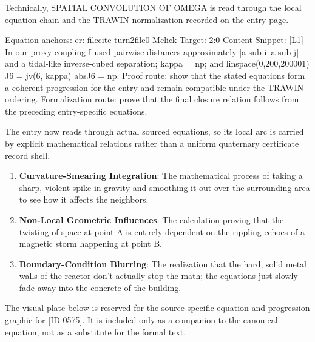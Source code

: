 Technically, SPATIAL CONVOLUTION OF OMEGA is read through the local equation chain and the TRAWIN normalization recorded on the entry page.

Equation anchors: er:  filecite turn2file0  Mclick Target: 2:0 Content Snippet: [L1]   In our proxy coupling I used pairwise distances approximately |a sub i--a sub j| and a tidal-like inverse-cubed separation; kappa = np; and linspace(0,200,200001) J6 = jv(6, kappa) absJ6 = np. Proof route: show that the stated equations form a coherent progression for the entry and remain compatible under the TRAWIN ordering. Formalization route: prove that the final closure relation follows from the preceding entry-specific equations.

The entry now reads through actual sourced equations, so its local arc is carried by explicit mathematical relations rather than a uniform quaternary certificate record shell.
\endgroup

\begin{enumerate}[leftmargin=1.6em,itemsep=6pt,topsep=4pt]
\item \textbf{Curvature-Smearing Integration}: The mathematical process of taking a sharp, violent spike in gravity and smoothing it out over the surrounding area to see how it affects the neighbors.
\item \textbf{Non-Local Geometric Influences}: The calculation proving that the twisting of space at point A is entirely dependent on the rippling echoes of a magnetic storm happening at point B.
\item \textbf{Boundary-Condition Blurring}: The realization that the hard, solid metal walls of the reactor don't actually stop the math; the equations just slowly fade away into the concrete of the building.
\end{enumerate}

\begingroup\footnotesize\sloppy
The visual plate below is reserved for the source-specific equation and progression graphic for [ID 0575]. It is included only as a companion to the canonical equation, not as a substitute for the formal text.
\par\endgroup
\ifTZPDarkEdition
{}
\fi

